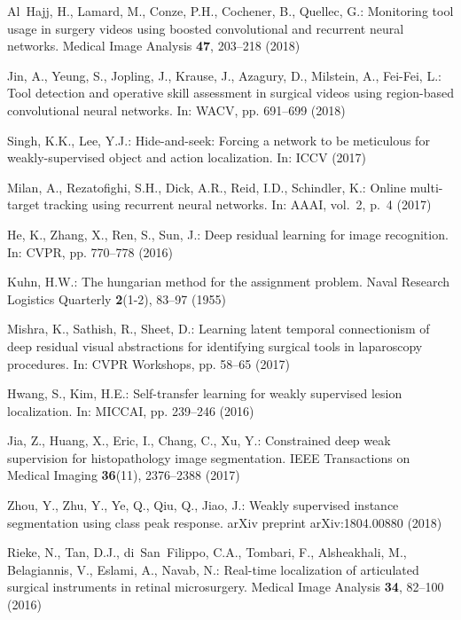 \documentclass{svjour3}                     \smartqed
\begin{document}
\begin{thebibliography}{10}
Al~Hajj, H., Lamard, M., Conze, P.H., Cochener, B., Quellec, G.: Monitoring
  tool usage in surgery videos using boosted convolutional and recurrent neural
  networks.
\newblock Medical Image Analysis \textbf{47}, 203--218 (2018)

Jin, A., Yeung, S., Jopling, J., Krause, J., Azagury, D., Milstein, A.,
  Fei-Fei, L.: Tool detection and operative skill assessment in surgical videos
  using region-based convolutional neural networks.
\newblock In: WACV, pp. 691--699 (2018)

Singh, K.K., Lee, Y.J.: Hide-and-seek: Forcing a network to be meticulous for
  weakly-supervised object and action localization.
\newblock In: ICCV (2017)

Milan, A., Rezatofighi, S.H., Dick, A.R., Reid, I.D., Schindler, K.: Online
  multi-target tracking using recurrent neural networks.
\newblock In: AAAI, vol.~2, p.~4 (2017)

He, K., Zhang, X., Ren, S., Sun, J.: Deep residual learning for image
  recognition.
\newblock In: CVPR, pp. 770--778 (2016)

Kuhn, H.W.: The hungarian method for the assignment problem.
\newblock Naval Research Logistics Quarterly \textbf{2}(1-2), 83--97 (1955)

Mishra, K., Sathish, R., Sheet, D.: Learning latent temporal connectionism of
  deep residual visual abstractions for identifying surgical tools in
  laparoscopy procedures.
\newblock In: CVPR Workshops, pp. 58--65 (2017)

Hwang, S., Kim, H.E.: Self-transfer learning for weakly supervised lesion
  localization.
\newblock In: MICCAI, pp. 239--246 (2016)

Jia, Z., Huang, X., Eric, I., Chang, C., Xu, Y.: Constrained deep weak
  supervision for histopathology image segmentation.
\newblock IEEE Transactions on Medical Imaging \textbf{36}(11), 2376--2388
  (2017)

Zhou, Y., Zhu, Y., Ye, Q., Qiu, Q., Jiao, J.: Weakly supervised instance
  segmentation using class peak response.
\newblock arXiv preprint arXiv:1804.00880  (2018)

Rieke, N., Tan, D.J., di~San~Filippo, C.A., Tombari, F., Alsheakhali, M.,
  Belagiannis, V., Eslami, A., Navab, N.: Real-time localization of articulated
  surgical instruments in retinal microsurgery.
\newblock Medical Image Analysis \textbf{34}, 82--100 (2016)


\end{thebibliography}
\end{document}

